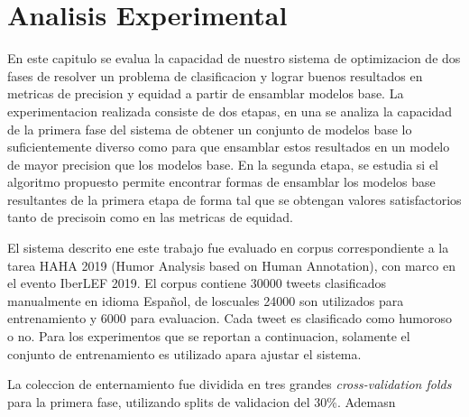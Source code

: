 \chapter{Analisis Experimental}\label{chapter:experiments}

En este capitulo se evalua la capacidad de nuestro sistema de optimizacion de dos fases de resolver un problema de clasificacion y lograr buenos resultados en metricas de precision y equidad a partir de ensamblar modelos base. La experimentacion realizada consiste de dos etapas, en una se analiza la capacidad de la primera fase del sistema de obtener un conjunto de modelos base lo suficientemente diverso como para que ensamblar estos resultados en un modelo de mayor precision que los modelos base. En la segunda etapa, se estudia si el algoritmo propuesto permite encontrar formas de ensamblar los modelos base resultantes de la primera etapa de forma tal que se obtengan valores satisfactorios tanto de precisoin como en las metricas de equidad.

El sistema descrito ene este trabajo fue evaluado en corpus correspondiente a la tarea HAHA 2019 (Humor Analysis based on Human Annotation), con marco en el evento IberLEF 2019. El corpus contiene 30000 tweets clasificados manualmente en idioma Español, de loscuales 24000 son utilizados para entrenamiento y 6000 para evaluacion. Cada tweet es clasificado como humoroso o no. Para los experimentos que se reportan a continuacion, solamente el conjunto de entrenamiento es utilizado apara ajustar el sistema.

La coleccion de enternamiento fue dividida en tres grandes \emph{cross-validation folds} para la primera fase, utilizando splits de validacion del 30\%. Ademasn

%
%
%
%
%
%
%
%
%
%
%
%
%
%
%
%
%

